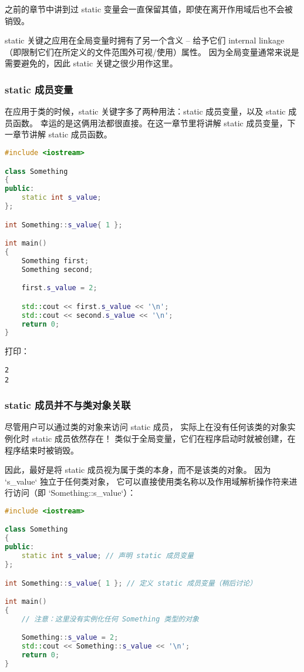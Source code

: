 \documentclass[../../LearnCpp.tex]{subfiles}
\begin{document}

之前的章节中讲到过 static 变量会一直保留其值，即使在离开作用域后也不会被销毁。

static 关键之应用在全局变量时拥有了另一个含义 -- 给予它们 internal linkage
（即限制它们在所定义的文件范围外可视/使用）属性。
因为全局变量通常来说是需要避免的，因此 static 关键之很少用作这里。

\subsubsection*{static 成员变量}

在应用于类的时候，static 关键字多了两种用法：static 成员变量，以及 static 成员函数。
幸运的是这俩用法都很直接。在这一章节里将讲解 static 成员变量，下一章节讲解 static 成员函数。

\begin{lstlisting}[language=C++]
#include <iostream>

class Something
{
public:
    static int s_value;
};

int Something::s_value{ 1 };

int main()
{
    Something first;
    Something second;

    first.s_value = 2;

    std::cout << first.s_value << '\n';
    std::cout << second.s_value << '\n';
    return 0;
}
\end{lstlisting}

打印：

\begin{lstlisting}
2
2
\end{lstlisting}

\subsubsection*{static 成员并不与类对象关联}

尽管用户可以通过类的对象来访问 static 成员，
实际上在没有任何该类的对象实例化时 static 成员依然存在！
类似于全局变量，它们在程序启动时就被创建，在程序结束时被销毁。

因此，最好是将 static 成员视为属于类的本身，而不是该类的对象。
因为 `s\_value` 独立于任何类对象，
它可以直接使用类名称以及作用域解析操作符来进行访问（即 `Something::s\_value`）：

\begin{lstlisting}[language=C++]
#include <iostream>

class Something
{
public:
    static int s_value; // 声明 static 成员变量
};

int Something::s_value{ 1 }; // 定义 static 成员变量（稍后讨论）

int main()
{
    // 注意：这里没有实例化任何 Something 类型的对象

    Something::s_value = 2;
    std::cout << Something::s_value << '\n';
    return 0;
}
\end{lstlisting}
\end{document}
